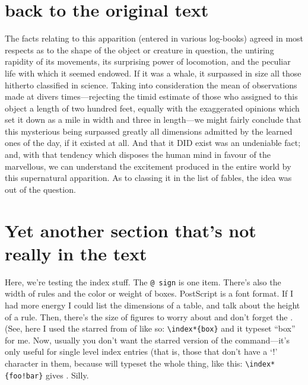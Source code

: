 \section{back to the original text}

The facts relating to this apparition (entered in various log-books)
agreed in most respects as to the shape of the object or creature in question,
the untiring rapidity of its movements, its surprising power of locomotion,
and the peculiar life with which it seemed endowed.  If it was a whale,
it surpassed in size all those hitherto classified in science.
Taking into consideration the mean of observations made at divers 
times---rejecting the timid estimate of those who assigned to this object
a length of two hundred feet, equally with the exaggerated opinions
which set it down as a mile in width and three in length---we might fairly
conclude that this mysterious being surpassed greatly all dimensions
admitted by the learned ones of the day, if it existed at all.
And that it DID exist was an undeniable fact; and, with that tendency
which disposes the human mind in favour of the marvellous, we can understand
the excitement produced in the entire world by this supernatural apparition.
As to classing it in the list of fables, the idea was out of the question.

\section{Yet another section that's not really in the text}

Here, we're testing the index stuff. The \texttt{@ sign}
is one item. There's also the width of rules and 
the color or weight of boxes.  
PostScript
is a font format.  If I had more energy I could list the
dimensions of a table, and talk about the height
of a rule.  
Then, there's the size of figures to worry about
and don't forget the .  (See, here I used the starred from of 
 like so:
\verb+\index*{box}+
and it typeset ``box'' for me.
Now, usually you don't want the starred version of the
 command---it's only useful for single level index entries 
(that is, those that don't have a `!' character in them, because 
will typeset the whole thing, like this: 
\verb+\index*{foo!bar}+
gives .  Silly.

